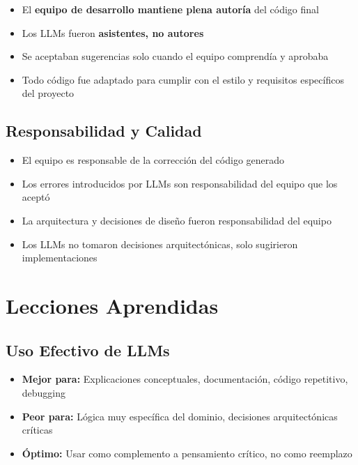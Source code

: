 \documentclass[12pt, a4paper]{article}
\begin{document}
\begin{itemize}[leftmargin=2em]
    \item El \textbf{equipo de desarrollo mantiene plena autoría} del código final
    \item Los LLMs fueron \textbf{asistentes, no autores}
    \item Se aceptaban sugerencias solo cuando el equipo comprendía y aprobaba
    \item Todo código fue adaptado para cumplir con el estilo y requisitos específicos del proyecto
\end{itemize}

\subsection{Responsabilidad y Calidad}

\begin{itemize}[leftmargin=2em]
    \item El equipo es responsable de la corrección del código generado
    \item Los errores introducidos por LLMs son responsabilidad del equipo que los aceptó
    \item La arquitectura y decisiones de diseño fueron responsabilidad del equipo
    \item Los LLMs no tomaron decisiones arquitectónicas, solo sugirieron implementaciones
\end{itemize}

\section{Lecciones Aprendidas}

\subsection{Uso Efectivo de LLMs}

\begin{itemize}[leftmargin=2em]
    \item \textbf{Mejor para:} Explicaciones conceptuales, documentación, código repetitivo, debugging
    \item \textbf{Peor para:} Lógica muy específica del dominio, decisiones arquitectónicas críticas
    \item \textbf{Óptimo:} Usar como complemento a pensamiento crítico, no como reemplazo
\end{itemize}
\end{document}
